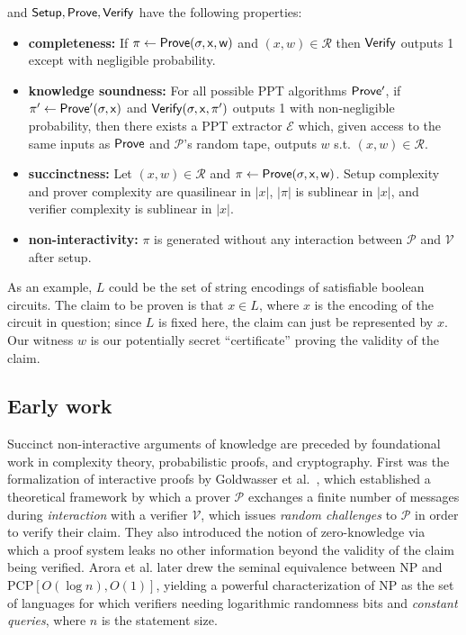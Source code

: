 \noindent and $\sf{Setup}, \sf{Prove}, \sf{Verify}$ have the following properties:
\begin{itemize}
    \item \textbf{completeness:} If $\pi \leftarrow \sf{Prove}(\sigma, x, w)$ and $(x, w) \in \mathcal{R}$ then $\sf{Verify}$ outputs 1 except with negligible probability.
    \item \textbf{knowledge soundness:} For all possible PPT algorithms $\sf{Prove'}$, if $\pi' \leftarrow \sf{Prove'}(\sigma, x)$ and $\sf{Verify}(\sigma, x, \pi')$ outputs 1 with non-negligible probability, then there exists a PPT extractor $\mathcal{E}$ which, given access to the same inputs as $\sf{Prove}$ and $\mathcal{P}$'s random tape, outputs $w$ s.t. $(x, w) \in \mathcal{R}$. 
    \item \textbf{succinctness:} Let $(x, w) \in \mathcal{R}$ and $\pi \leftarrow \sf{Prove}(\sigma, x, w)$. Setup complexity and prover complexity are quasilinear in $|x|$, $|\pi|$ is sublinear in $|x|$, and verifier complexity is sublinear in $|x|$.
    \item \textbf{non-interactivity:} $\pi$ is generated without any interaction between $\mathcal{P}$ and $\mathcal{V}$ after setup.
\end{itemize}

\noindent As an example, $L$ could be the set of string encodings of satisfiable boolean circuits. The claim to be proven is that $x \in L$, where $x$ is the encoding of the circuit in question; since $L$ is fixed here, the claim can just be represented by $x$. Our witness $w$ is our potentially secret ``certificate'' proving the validity of the claim.\\

\subsection{Early work}
\noindent Succinct non-interactive arguments of knowledge are preceded by foundational work in complexity theory, probabilistic proofs, and cryptography. First was the formalization of interactive proofs by Goldwasser et al.\ \cite{ipfirst}, which established a theoretical framework by which a prover $\mathcal{P}$ exchanges a finite number of messages during \textit{interaction} with a verifier $\mathcal{V}$, which issues \textit{random challenges} to $\mathcal{P}$ in order to verify their claim. They also introduced the notion of zero-knowledge via which a proof system leaks no other information beyond the validity of the claim being verified. Arora et al. \cite{pcpthm1, pcpthm2} later drew the seminal equivalence between NP and PCP$[O(\log n), O(1)]$, yielding a powerful characterization of NP as the set of languages for which verifiers needing logarithmic randomness bits and \textit{constant queries}, where $n$ is the statement size.\\

